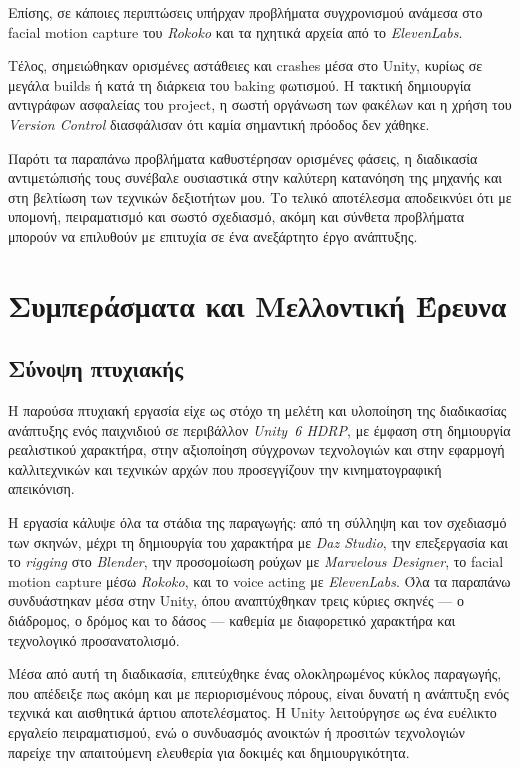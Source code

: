 Επίσης, σε κάποιες περιπτώσεις υπήρχαν προβλήματα συγχρονισμού 
ανάμεσα στο facial motion capture του \textit{Rokoko} 
και τα ηχητικά αρχεία από το \textit{ElevenLabs}.


Τέλος, σημειώθηκαν ορισμένες αστάθειες και crashes μέσα στο Unity, 
κυρίως σε μεγάλα builds ή κατά τη διάρκεια του baking φωτισμού. 
Η τακτική δημιουργία αντιγράφων ασφαλείας του project, 
η σωστή οργάνωση των φακέλων και η χρήση του \textit{Version Control} 
διασφάλισαν ότι καμία σημαντική πρόοδος δεν χάθηκε.

Παρότι τα παραπάνω προβλήματα καθυστέρησαν ορισμένες φάσεις, 
η διαδικασία αντιμετώπισής τους συνέβαλε ουσιαστικά στην καλύτερη κατανόηση 
της μηχανής και στη βελτίωση των τεχνικών δεξιοτήτων μου. 
Το τελικό αποτέλεσμα αποδεικνύει ότι με υπομονή, πειραματισμό 
και σωστό σχεδιασμό, ακόμη και σύνθετα προβλήματα μπορούν να επιλυθούν 
με επιτυχία σε ένα ανεξάρτητο έργο ανάπτυξης.

\chapter{Συμπεράσματα και Μελλοντική Έρευνα}
\section{Σύνοψη πτυχιακής}
Η παρούσα πτυχιακή εργασία είχε ως στόχο τη μελέτη και υλοποίηση 
της διαδικασίας ανάπτυξης ενός παιχνιδιού σε περιβάλλον 
\textit{Unity~6 HDRP}, με έμφαση στη δημιουργία ρεαλιστικού χαρακτήρα, 
στην αξιοποίηση σύγχρονων τεχνολογιών και στην εφαρμογή 
καλλιτεχνικών και τεχνικών αρχών που προσεγγίζουν 
την κινηματογραφική απεικόνιση.

Η εργασία κάλυψε όλα τα στάδια της παραγωγής: 
από τη σύλληψη και τον σχεδιασμό των σκηνών, 
μέχρι τη δημιουργία του χαρακτήρα με \textit{Daz Studio}, 
την επεξεργασία και το \textit{rigging} στο \textit{Blender}, 
την προσομοίωση ρούχων με \textit{Marvelous Designer}, 
το facial motion capture μέσω \textit{Rokoko}, 
και το voice acting με \textit{ElevenLabs}. 
Όλα τα παραπάνω συνδυάστηκαν μέσα στην Unity, 
όπου αναπτύχθηκαν τρεις κύριες σκηνές — 
ο διάδρομος, ο δρόμος και το δάσος — 
καθεμία με διαφορετικό χαρακτήρα και τεχνολογικό προσανατολισμό.

Μέσα από αυτή τη διαδικασία, επιτεύχθηκε ένας ολοκληρωμένος κύκλος παραγωγής, 
που απέδειξε πως ακόμη και με περιορισμένους πόρους, 
είναι δυνατή η ανάπτυξη ενός τεχνικά και αισθητικά άρτιου αποτελέσματος. 
Η Unity λειτούργησε ως ένα ευέλικτο εργαλείο πειραματισμού, 
ενώ ο συνδυασμός ανοικτών ή προσιτών τεχνολογιών 
παρείχε την απαιτούμενη ελευθερία για δοκιμές και δημιουργικότητα.

